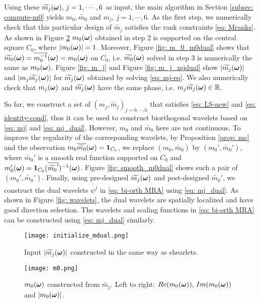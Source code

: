 Using these $\widetilde{m_{j}}(\boldsymbol{\omega}),\,j = 1,\cdots,6$ as input, the main algorithm in Section \ref{subsec: compute-m0} yields $m_0,\widetilde{m_0}$ and $m_j, \, j = 1,\cdots, 6$. As the first step, we numerically check that this particular design of $\widetilde{m_j}$ satisfies the rank constraints \eqref{eq: Mranks}. As shown in Figure \ref{fig: m_0} $m_0(\boldsymbol{\omega})$ obtained in step 2 is supported on the central square $C_0$, where $|m_0(\boldsymbol{\omega})| = 1$. Moreover, Figure \ref{fig: m_0_m0dual} shows that $\widetilde{m_{0}}(\boldsymbol{\omega}) = \overline{m_0^{-1}}(\boldsymbol{\omega}) = m_0(\boldsymbol{\omega})$ on $C_0$, i.e. $\widetilde{m_{0}}(\boldsymbol{\omega})$ solved in step 3 is numerically the same as $m_0(\boldsymbol{\omega})$.
Figure \ref{fig: m_j} and Figure \ref{fig: m_j_mjdual} show $|\widetilde{m_{j}}(\boldsymbol{\omega})|$ and $|m_j\widetilde{m_{j}}(\boldsymbol{\omega})|$ for $\widetilde{m_{j}}(\boldsymbol{\omega})$ obtained by solving \eqref{eq: mj-eq}. We also numerically check that $m_j(\boldsymbol{\omega})$ and $\widetilde{m_{j}}(\boldsymbol{\omega})$ have the same phase, i.e. $m_j\widetilde{m_{j}}(\boldsymbol{\omega})\in \mathbb{R}$.

So far, we construct a set of $(m_j,\widetilde{m_j})_{j = 0,\cdots,6}$ that satisfies \eqref{eq: LS-new} and \eqref{eq: identity-cond}, thus it can be used to construct biorthogonal wavelets based on \eqref{eq: mj} and \eqref{eq: mj_dual}. However, $m_0$ and $\widetilde{m_0}$ here are not continuous. To improve the regularity of the corresponding wavelets, by Proposition \ref{prop: mc} and the observation $m_0\overline{\widetilde{m_{0}}}(\boldsymbol{\omega}) = \boldsymbol{1}_{C_0}$, we replace $(m_0,\widetilde{m_0})$ by $(m_0', \widetilde{m_0}')$, where $\widetilde{m_0}'$ is a smooth real function supported on $C_0$ and $m_0'(\boldsymbol{\omega}) = \boldsymbol{1}_{C_0}(\overline{\widetilde{m_0}'})^{-1}(\boldsymbol{\omega})$. Figure \ref{fig: smooth_m0dual} shows such a pair of $(m_0',\widetilde{m_0}')$. Finally, using pre-designed $\widetilde{m_{j}}(\boldsymbol{\omega})$ and post-designed $\widetilde{m_0}'$, we construct the dual wavelets  $\widetilde{\psi^j}$ in \eqref{eq: bi-orth MRA} using \eqref{eq: mj_dual}. As shown in Figure \ref{fig: wavelets}, the dual wavelets are spatially localized and have good direction selection. The wavelets and scaling functions in \eqref{eq: bi-orth MRA} can be constructed using \eqref{eq: mj_dual} similarly.

\begin{figure}
\centering
\texttt{[image: initialize\_mdual.png]}
\caption{ Input $|\widetilde{m_{j}}(\boldsymbol{\omega})|$ constructed in the same way as shearlets.}
\label{fig: mjdual}
\end{figure}

\begin{figure}
\centering
\texttt{[image: m0.png]}
\caption{ $m_0(\boldsymbol{\omega})$ constructed from $\widetilde{m_j}$. Left to right: $Re(m_0(\boldsymbol{\omega})),\, Im(m_0(\boldsymbol{\omega}))$ and $|m_0(\boldsymbol{\omega})|$.}
\label{fig: m_0}
\end{figure}

